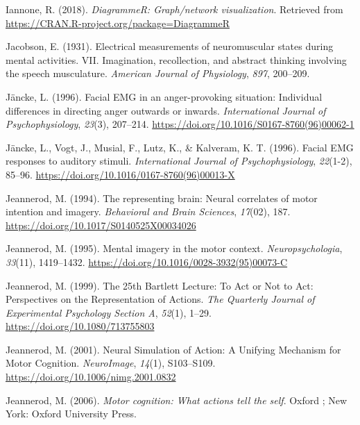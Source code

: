 \documentclass[a4paper,12pt,twoside,openright,oldfontcommands]{memoir}
\begin{document}
\leavevmode\hypertarget{ref-R-DiagrammeR}{}%
Iannone, R. (2018). \emph{DiagrammeR: Graph/network visualization}. Retrieved from \url{https://CRAN.R-project.org/package=DiagrammeR}

\leavevmode\hypertarget{ref-jacobson_electrical_1931}{}%
Jacobson, E. (1931). Electrical measurements of neuromuscular states during mental activities. VII. Imagination, recollection, and abstract thinking involving the speech musculature. \emph{American Journal of Physiology}, \emph{897}, 200--209.

\leavevmode\hypertarget{ref-Jancke1996a}{}%
Jäncke, L. (1996). Facial EMG in an anger-provoking situation: Individual differences in directing anger outwards or inwards. \emph{International Journal of Psychophysiology}, \emph{23}(3), 207--214. \url{https://doi.org/10.1016/S0167-8760(96)00062-1}

\leavevmode\hypertarget{ref-Jancke1996}{}%
Jäncke, L., Vogt, J., Musial, F., Lutz, K., \& Kalveram, K. T. (1996). Facial EMG responses to auditory stimuli. \emph{International Journal of Psychophysiology}, \emph{22}(1-2), 85--96. \url{https://doi.org/10.1016/0167-8760(96)00013-X}

\leavevmode\hypertarget{ref-jeannerod_representing_1994}{}%
Jeannerod, M. (1994). The representing brain: Neural correlates of motor intention and imagery. \emph{Behavioral and Brain Sciences}, \emph{17}(02), 187. \url{https://doi.org/10.1017/S0140525X00034026}

\leavevmode\hypertarget{ref-jeannerod_mental_1995}{}%
Jeannerod, M. (1995). Mental imagery in the motor context. \emph{Neuropsychologia}, \emph{33}(11), 1419--1432. \url{https://doi.org/10.1016/0028-3932(95)00073-C}

\leavevmode\hypertarget{ref-jeannerod_25th_1999}{}%
Jeannerod, M. (1999). The 25th Bartlett Lecture: To Act or Not to Act: Perspectives on the Representation of Actions. \emph{The Quarterly Journal of Experimental Psychology Section A}, \emph{52}(1), 1--29. \url{https://doi.org/10.1080/713755803}

\leavevmode\hypertarget{ref-jeannerod_neural_2001}{}%
Jeannerod, M. (2001). Neural Simulation of Action: A Unifying Mechanism for Motor Cognition. \emph{NeuroImage}, \emph{14}(1), S103--S109. \url{https://doi.org/10.1006/nimg.2001.0832}

\leavevmode\hypertarget{ref-jeannerod_motor_2006}{}%
Jeannerod, M. (2006). \emph{Motor cognition: What actions tell the self}. Oxford ; New York: Oxford University Press.
\end{document}
